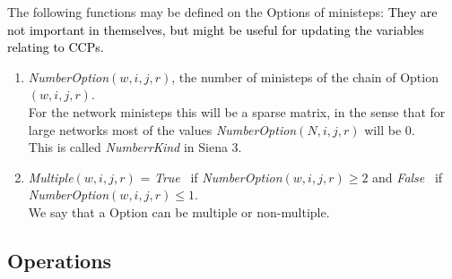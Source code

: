 \documentclass[a4paper,12pt,fleqn]{article}
\newcommand{\nnm}[1]{\textsf{\small\textit{#1}\ }}
\newcommand{\adda}[1]{{#1}}  %
\newcommand{\addaa}[1]{{\textcolor[named]{Black}{#1}}}  %
\begin{document}
The following functions may be defined on the \adda{Option}s of ministeps:
\addaa{They are not important in themselves, but might be useful for updating
the variables relating to CCPs. }
\begin{enumerate}
\item \textit{NumberOption}$(w,i,j,r)$, the number of ministeps of the chain
      of \adda{Option} $(w,i,j,r)$.\\
      For the network ministeps this will be a sparse matrix, in the sense that for large networks
      most of the values \textit{NumberOption}$(N,i,j,r)$ will be 0.\\
      This is called \textit{NumberrKind} in Siena 3.
\item \textit{Multiple}$(w,i,j,r)$ = \nnm{True} if \textit{NumberOption}$(w,i,j,r) \geq 2$
      and \nnm{False} if \textit{NumberOption}$(w,i,j,r) \leq 1$.\\
      We say that a \adda{Option} can be multiple or non-multiple.
\end{enumerate}


\subsection{Operations}
\end{document}
